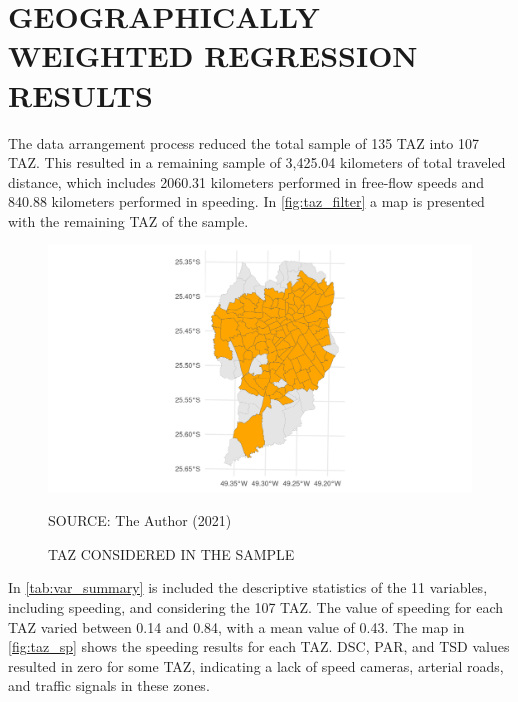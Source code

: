 \section{GEOGRAPHICALLY WEIGHTED REGRESSION RESULTS} \label{sec:gwrr}



The data arrangement process reduced the total sample of 135 TAZ into 107 TAZ. This resulted in a remaining sample of 3,425.04 kilometers of total traveled distance, which includes 2060.31 kilometers performed in free-flow speeds and 840.88 kilometers performed in speeding. In \autoref{fig:taz_filter} a map is presented with the remaining TAZ of the sample.  

\begin{figure}[!htbp]
    \centering\footnotesize
    \captionsetup{font=footnotesize}
    \caption{TAZ CONSIDERED IN THE SAMPLE}
    \includegraphics{fig/taz_filter.png}
    \label{fig:taz_filter}
    \par SOURCE: The Author (2021)
\end{figure}


In \autoref{tab:var_summary} is included the descriptive statistics of the 11 variables, including speeding, and considering the 107 TAZ. The value of speeding for each TAZ varied between 0.14 and 0.84, with a mean value of 0.43. The map in \autoref{fig:taz_sp} shows the speeding results for each TAZ. DSC, PAR, and TSD values resulted in zero for some TAZ, indicating a lack of speed cameras, arterial roads, and traffic signals in these zones. 


